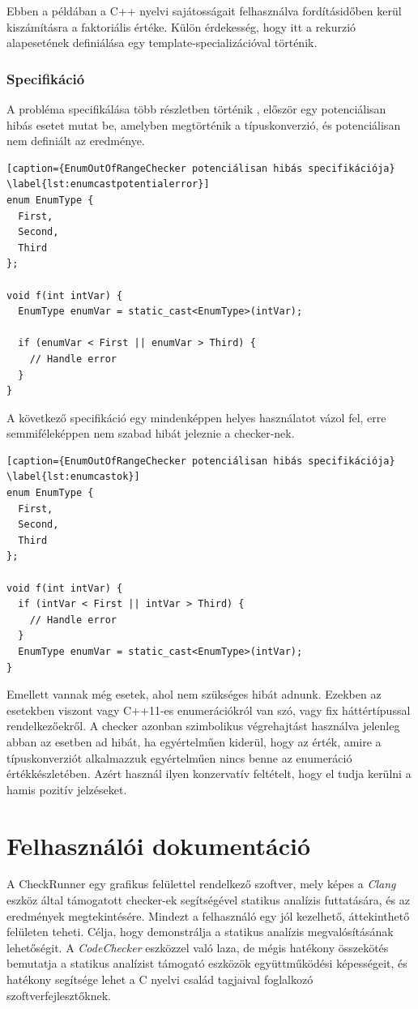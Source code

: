 \documentclass[a4paper,12pt]{report}
\begin{document}
Ebben a példában a C++ nyelvi sajátosságait felhasználva fordításidőben kerül kiszámításra a faktoriális értéke. Külön érdekesség, hogy itt a rekurzió alapesetének definiálása egy template-specializációval történik.


\subsection{Specifikáció}
A probléma specifikálása több részletben történik \cite{securecodingint50}, először egy potenciálisan hibás esetet mutat be, amelyben megtörténik a típuskonverzió, és potenciálisan nem definiált az eredménye.

\begin{lstlisting}[caption={EnumOutOfRangeChecker potenciálisan hibás specifikációja}
\label{lst:enumcastpotentialerror}]
enum EnumType {
  First,
  Second,
  Third
};
 
void f(int intVar) {
  EnumType enumVar = static_cast<EnumType>(intVar);
 
  if (enumVar < First || enumVar > Third) {
    // Handle error
  }
}
\end{lstlisting}

A következő specifikáció egy mindenképpen helyes használatot vázol fel, erre semmiféleképpen nem szabad hibát jeleznie a checker-nek.

\begin{lstlisting}[caption={EnumOutOfRangeChecker potenciálisan hibás specifikációja}
\label{lst:enumcastok}]
enum EnumType {
  First,
  Second,
  Third
};
 
void f(int intVar) {
  if (intVar < First || intVar > Third) {
    // Handle error
  }
  EnumType enumVar = static_cast<EnumType>(intVar);
}
\end{lstlisting}

Emellett vannak még esetek, ahol nem szükséges hibát adnunk. Ezekben az esetekben viszont vagy C++11-es enumerációkról van szó, vagy fix háttértípussal rendelkezőekről. A checker azonban szimbolikus végrehajtást használva jelenleg abban az esetben ad hibát, ha egyértelműen kiderül, hogy az érték, amire a típuskonverziót alkalmazzuk egyértelműen nincs benne az enumeráció értékkészletében. Azért használ ilyen konzervatív feltételt, hogy el tudja kerülni a hamis pozitív jelzéseket.

\chapter{Felhasználói dokumentáció}
A CheckRunner egy grafikus felülettel rendelkező szoftver, mely képes a \emph{Clang} eszköz által támogatott checker-ek segítségével statikus analízis futtatására, és az eredmények megtekintésére. Mindezt a felhasználó egy jól kezelhető, áttekinthető felületen teheti. Célja, hogy demonstrálja a statikus analízis megvalósításának lehetőségit. A \emph{CodeChecker} eszközzel való laza, de mégis hatékony összekötés bemutatja a statikus analízist támogató eszközök együttműködési képességeit, és hatékony segítsége lehet a C nyelvi család tagjaival foglalkozó szoftverfejlesztőknek.
\end{document}
